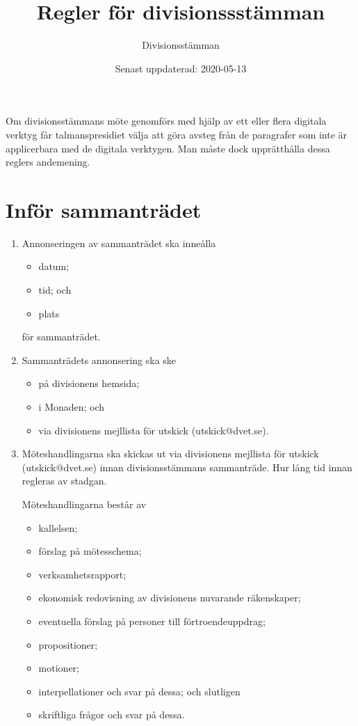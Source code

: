 \documentclass{dvd}
\begin{document}
	\title{Regler för divisionssstämman}
	\author{Divisionsstämman}
	\date{Senast uppdaterad: 2020-05-13}

	Om divisionsstämmans möte genomförs med hjälp av ett eller flera digitala verktyg får talmanspresidiet välja att göra avsteg från de paragrafer som inte är applicerbara med de digitala verktygen.
	Man måste dock upprätthålla dessa reglers andemening.

	\section{Inför sammanträdet}

	\begin{enumerate}[label=\arabic* §, ref=\arabic*]
		\item Annonseringen av sammanträdet ska inneålla

		\begin{itemize}
			\item datum;
			\item tid; och
			\item plats
		\end{itemize}

		för sammanträdet.

		\item Sammanträdets annonsering ska ske

		\begin{itemize}
			\item på divisionens hemsida;
			\item i Monaden; och
			\item via divisionens mejllista för utskick (utskick@dvet.se).
		\end{itemize}

		\item Möteshandlingarna ska skickas ut via divisionens mejllista för utskick (utskick@dvet.se) innan divisionsstämmans sammanträde.
		Hur lång tid innan regleras av stadgan.

		Möteshandlingarna består av

		\begin{itemize}
			\item kallelsen;
			\item förslag på mötesschema;
			\item verksamhetsrapport;
			\item ekonomisk redovisning av divisionens nuvarande räkenskaper;
			\item eventuella förslag på personer till förtroendeuppdrag;
			\item propositioner;
			\item motioner;
			\item interpellationer och svar på dessa; och slutligen
			\item skriftliga frågor och svar på dessa.
		\end{itemize}


\end{enumerate}
\end{document}
